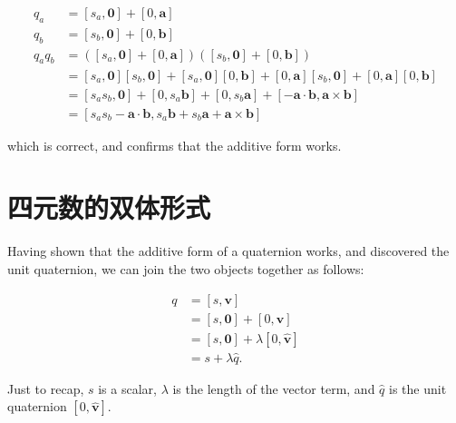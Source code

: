 $$
    \begin{aligned}
        q_{a}       & =\left[s_{a}, \mathbf{0}\right]+[0, \mathbf{a}]                                                                                                                                          \\
        q_{b}       & =\left[s_{b}, \mathbf{0}\right]+[0, \mathbf{b}]                                                                                                                                          \\
        q_{a} q_{b} & =\left(\left[s_{a}, \mathbf{0}\right]+[0, \mathbf{a}]\right)\left(\left[s_{b}, \mathbf{0}\right]+[0, \mathbf{b}]\right)                                                                  \\
                    & =\left[s_{a}, \mathbf{0}\right]\left[s_{b}, \mathbf{0}\right]+\left[s_{a}, \mathbf{0}\right][0, \mathbf{b}]+[0, \mathbf{a}]\left[s_{b}, \mathbf{0}\right]+[0, \mathbf{a}][0, \mathbf{b}] \\
                    & =\left[s_{a} s_{b}, \mathbf{0}\right]+\left[0, s_{a} \mathbf{b}\right]+\left[0, s_{b} \mathbf{a}\right]+[-\mathbf{a} \cdot \mathbf{b}, \mathbf{a} \times \mathbf{b}]                     \\
                    & =\left[s_{a} s_{b}-\mathbf{a} \cdot \mathbf{b}, s_{a} \mathbf{b}+s_{b} \mathbf{a}+\mathbf{a} \times \mathbf{b}\right]
    \end{aligned}
$$

which is correct, and confirms that the additive form works.

\section{四元数的双体形式}
Having shown that the additive form of a quaternion works, and discovered the unit quaternion, we can join the two objects together as follows:

$$
    \begin{aligned}
        q & =[s, \mathbf{v}]                              \\
          & =[s, \mathbf{0}]+[0, \mathbf{v}]              \\
          & =[s, \mathbf{0}]+\lambda[0, \hat{\mathbf{v}}] \\
          & =s+\lambda \hat{q} .
    \end{aligned}
$$

Just to recap, $s$ is a scalar, $\lambda$ is the length of the vector term, and $\hat{q}$ is the unit quaternion $[0, \hat{\mathbf{v}}]$.

